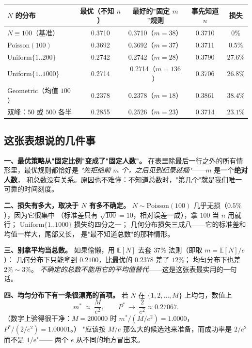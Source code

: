 \documentclass[UTF8,11pt,fontset=macnew]{ctexart}
\begin{document}
\begin{center}
\footnotesize
\setlength{\tabcolsep}{6pt}
\begin{tabular}{l c c c c}
\toprule
$N$ 的分布 & 最优（不知 $n$） & 最好的"固定 $m$"规则 & 事先知道 $n$ & 损失 \\
\midrule
$N\equiv 100$（基准）        & 0.3710 & 0.3710（$m{=}38$）  & 0.3710 & $0\%$ \\
$\mathrm{Poisson}(100)$      & 0.3692 & 0.3692（$m{=}37$）  & 0.3711 & $0.5\%$ \\
$\mathrm{Uniform}\{1..200\}$ & 0.2742 & 0.2742（$m{=}28$）  & 0.3790 & $27.6\%$ \\
$\mathrm{Uniform}\{1..1000\}$& 0.2714 & 0.2714（$m{=}136$） & 0.3706 & $26.8\%$ \\
$\mathrm{Geometric}$（均值 $100$）& 0.2378 & 0.2378（$m{=}18$） & 0.3861 & $38.4\%$ \\
双峰：$50$ 或 $500$ 各半    & 0.2855 & 0.2526（$m{=}23$）  & 0.3714 & $23.1\%$ \\
\bottomrule
\end{tabular}
\end{center}

\subsection{这张表想说的几件事}

\textbf{一、最优策略从"固定比例"变成了"固定人数"。}
在表里除最后一行之外的所有情形里，最优规则都恰好是
\emph{"先拒绝前 $m$ 个，之后见到纪录就摘"}——$m$ 是一个\textbf{绝对人数}，
和总数没有关系。原因也不难懂：不知道总数时，"第几个"就是我们唯一可靠的时间刻度。

\textbf{二、损失有多大，取决于 $N$ 有多不确定。}
$N\sim\mathrm{Poisson}(100)$ 几乎无损（$0.5\%$），因为它很集中
（标准差只有 $\sqrt{100}=10$，相对误差一成），拿 $100$ 当 $n$ 用就行；
$\mathrm{Uniform}\{1..1000\}$ 损失约四分之一；
几何分布损失三成八——它的标准差和均值一样大，尾部又长，
是"最不知道总数"的那种情形。

\textbf{三、别拿平均当总数。}
如果偷懒，用 $\mathbb{E}[N]$ 去套 $37\%$ 法则（即取 $m=\mathbb{E}[N]/e$）：
几何分布下只能拿到 $0.2100$，比最优的 $0.2378$ 差了 $12\%$；
均匀分布下也差 $2\%\sim3\%$。
\emph{不确定的总数不能用它的平均值替代}——这是这张表最实用的一句话。

\textbf{四、均匀分布下有一条很漂亮的首项。}
若 $N$ 在 $\{1,2,\dots,M\}$ 上均匀，数值上
\[
m^*\ \approx\ \frac{M}{e^{2}},\qquad P^*\ \to\ \frac{2}{e^{2}}\approx 0.27067 .
\]
（数字上验得很干净：$M=200000$ 时 $m^*\big/(M/e^2)=1.0000$，
$P^*\big/(2/e^2)=1.00001$。）
"应该按 $M/e$ 那么大的候选池来准备，而成功率是 $2/e^2$ 而不是 $1/e$"——
两个 $e$ 从不同的地方冒出来。
\end{document}
